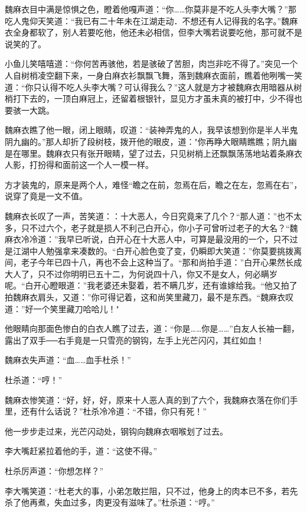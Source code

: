 \documentclass[12pt,oneside]{book}
\begin{document}
魏麻衣目中满是惊惧之色，瞪着他嘎声道：``你\ldots\ldots 你莫非是不吃人头李大嘴？''那吃人鬼仰天笑道：``我已有二十年未在江湖走动．不想还有人记得我的名字。''魏麻衣全身都软了，别人若要吃他，他还未必相信，但李大嘴若说要吃他，那可就不是说笑的了。

小鱼儿笑嘻嘻道：``你何苦再骇他，若是骇破了苦胆，肉岂非吃不得了。''突见一个人自树梢凌空翻下来，一身白麻衣衫飘飘飞舞，落到魏麻衣面前，瞧着他咧嘴一笑道：``你只认得不吃人头李大嘴？可认得我么？''这人就是方才被魏麻衣用暗器从树梢打下去的，一顶白麻冠上，还留着根银针，显见方才虽未真的被打中，少不得也要骇一大跳。

魏麻衣瞧了他一眼，闭上眼睛，叹道：``装神弄鬼的人，我早该想到你是半人半鬼阴九幽的。''那人却折了段树枝，拨开他的眼皮，道："你再睁大眼睛瞧瞧；阴九幽是在哪里。魏麻衣只有张开眼睛，望了过去，只见树梢上还飘飘荡荡地站着条麻衣人影，打扮得和面前这一个人一模一样。

方才装鬼的，原来是两个人，难怪``瞻之在前，忽焉在后，瞻之在左，忽焉在右''，说穿了竟是一文不值。

魏麻衣长叹了一声，苦笑道：：十大恶人，今日究竟来了几个？``那人道：''也不太多，只不过六个，老子就是损人不利己白开心，你小子可曾听过老子的大名？``魏麻衣冷冷道：''我早已听说，白开心在十大恶人中，可算是最没用的一个，只不过是江湖中人勉强拿来凑数的。``白开心脸色变了变，仍瞬即大笑道：''你莫要挑拨离间，老子今年已四十八，再也不会上这种当了。``那和尚拍手道：''白开心果然长成大人了，只不过你明明已五十二，为何说四十八，你又不是女人，何必瞒岁呢。``白开心瞪眼道：''我老婆还未娶着，若不瞒几岁，还有谁嫁给我。``他又拍了拍魏麻衣肩头，又道：''你可得记着，这和尚笑里藏刀，最不是东西。``魏麻衣叹道：''好一个笑里藏刀哈哈儿！"

他眼睛向那面色惨白的白衣人瞧了过去，道：``你是\ldots\ldots 你是\ldots\ldots{}''白友人长袖一翻，露出了双手──右手竟是一只雪亮的钢钩，左手上光芒闪闪，其红如血！

魏麻衣失声道：``血\ldots\ldots 血手杜杀！''

杜杀道：``哼！''

魏麻衣惨笑道：``好，好，好，原来十人恶人真的到了六个，我魏麻衣落在你们手里，还有什么话说？''杜杀冷冷道：``不错，你只有死！''

他一步步走过来，光芒闪动处，钢钩向魏麻衣咽喉划了过去。

李大嘴赶紧拉着他的手，道：``这使不得。''

杜杀厉声道：``你想怎样？''

李大嘴笑道：``杜老大的事，小弟怎敢拦阻，只不过，他身上的肉本已不多，若先杀了他再煮，失血过多，肉更没有滋味了。''杜杀道：``哼。''
\end{document}
